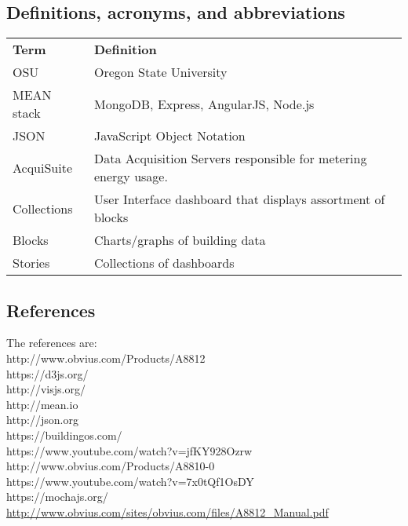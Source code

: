 \documentclass[journal,10pt,onecolumn,compsoc]{IEEEtran}
\begin{document}
    \subsection{Definitions, acronyms, and abbreviations} \label{definition}
	\begin{table}[h]
	\centering
	
	\begin{tabular}{ll}
	\textbf{Term} & \textbf{Definition} \\
	OSU & Oregon State University \\
	MEAN stack & MongoDB, Express, AngularJS, Node.js \\
	JSON & JavaScript Object Notation \\
	AcquiSuite & Data Acquisition Servers responsible for metering energy usage. \\
	Collections & User Interface dashboard that displays assortment of blocks \\
    Blocks & Charts/graphs of building data \\
    Stories & Collections of dashboards 
	\end{tabular}
	\end{table}
    \subsection{References} 
	The references are:\\
	http://www.obvius.com/Products/A8812 \\
    https://d3js.org/  \\
    http://visjs.org/  \\
    http://mean.io  \\
	http://json.org \\ 
	https://buildingos.com/ \\ 
    https://www.youtube.com/watch?v=jfKY928Ozrw \\ 
    http://www.obvius.com/Products/A8810-0 \\ 
    https://www.youtube.com/watch?v=7x0tQf1OsDY \\ 
    https://mochajs.org/ \\ 
    \url{http://www.obvius.com/sites/obvius.com/files/A8812_Manual.pdf} \\
\end{document}
